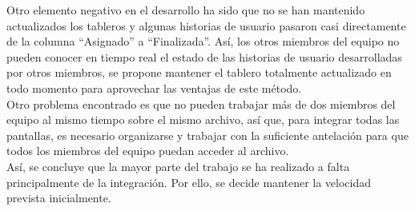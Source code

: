 \documentclass[11pt]{article}
\begin{document}
Otro elemento negativo en el desarrollo ha sido que no se han mantenido actualizados los tableros y algunas historias de usuario pasaron casi directamente de la columna ``Asignado'' a ``Finalizada''. Así, los otros miembros del equipo no pueden conocer en tiempo real el estado de las historias de usuario desarrolladas por otros miembros, se propone mantener el tablero totalmente actualizado en todo momento para aprovechar las ventajas de este método. \\

Otro problema encontrado es que no pueden trabajar más de dos miembros del equipo al mismo tiempo sobre el mismo archivo, así que, para integrar todas las pantallas, es necesario organizarse y trabajar con la suficiente antelación para que todos los miembros del equipo puedan acceder al archivo.\\

Así, se concluye que la mayor parte del trabajo se ha realizado a falta principalmente de la integración. Por ello, se decide mantener la velocidad prevista inicialmente. 
\end{document}
